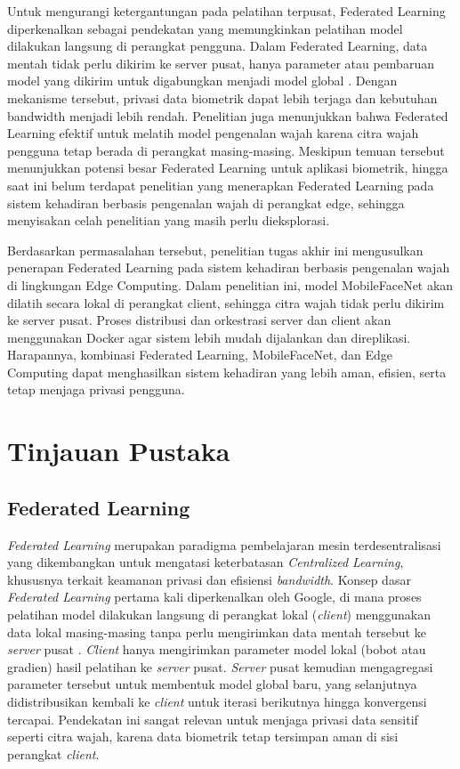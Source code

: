 \documentclass[conference]{IEEEtran}
\begin{document}
Untuk mengurangi ketergantungan pada pelatihan terpusat, Federated Learning diperkenalkan sebagai pendekatan yang memungkinkan pelatihan model dilakukan langsung di perangkat pengguna. Dalam Federated Learning, data mentah tidak perlu dikirim ke server pusat, hanya parameter atau pembaruan model yang dikirim untuk digabungkan menjadi model global \cite{b4}. Dengan mekanisme tersebut, privasi data biometrik dapat lebih terjaga dan kebutuhan bandwidth menjadi lebih rendah. Penelitian \cite{b5} juga menunjukkan bahwa Federated Learning efektif untuk melatih model pengenalan wajah karena citra wajah pengguna tetap berada di perangkat masing-masing. Meskipun temuan tersebut menunjukkan potensi besar Federated Learning untuk aplikasi biometrik, hingga saat ini belum terdapat penelitian yang menerapkan Federated Learning pada sistem kehadiran berbasis pengenalan wajah di perangkat edge, sehingga menyisakan celah penelitian yang masih perlu dieksplorasi.

Berdasarkan permasalahan tersebut, penelitian tugas akhir ini mengusulkan penerapan Federated Learning pada sistem kehadiran berbasis pengenalan wajah di lingkungan Edge Computing. Dalam penelitian ini, model MobileFaceNet akan dilatih secara lokal di perangkat client, sehingga citra wajah tidak perlu dikirim ke server pusat. Proses distribusi dan orkestrasi server dan client akan menggunakan Docker agar sistem lebih mudah dijalankan dan direplikasi. Harapannya, kombinasi Federated Learning, MobileFaceNet, dan Edge Computing dapat menghasilkan sistem kehadiran yang lebih aman, efisien, serta tetap menjaga privasi pengguna.

\section{Tinjauan Pustaka}

\subsection{Federated Learning}
\textit{Federated Learning} merupakan paradigma pembelajaran mesin terdesentralisasi yang dikembangkan untuk mengatasi keterbatasan \textit{Centralized Learning}, khususnya terkait keamanan privasi dan efisiensi \textit{bandwidth}. Konsep dasar \textit{Federated Learning} pertama kali diperkenalkan oleh Google, di mana proses pelatihan model dilakukan langsung di perangkat lokal (\textit{client}) menggunakan data lokal masing-masing tanpa perlu mengirimkan data mentah tersebut ke \textit{server} pusat \cite{b6}. \textit{Client} hanya mengirimkan parameter model lokal (bobot atau gradien) hasil pelatihan ke \textit{server} pusat. \textit{Server} pusat kemudian mengagregasi parameter tersebut untuk membentuk model global baru, yang selanjutnya didistribusikan kembali ke \textit{client} untuk iterasi berikutnya hingga konvergensi tercapai. Pendekatan ini sangat relevan untuk menjaga privasi data sensitif seperti citra wajah, karena data biometrik tetap tersimpan aman di sisi perangkat \textit{client}.
\end{document}
